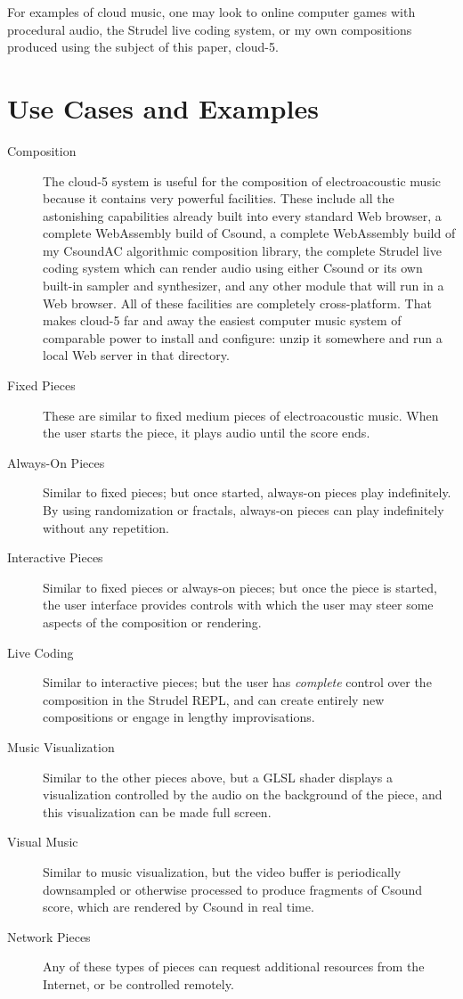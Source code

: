 \documentclass[runningheads,a4paper]{llncs}
\begin{document}
For examples of cloud music, one may look to online computer games with procedural audio, the Strudel live coding system, or my own compositions produced using the subject of this paper, cloud-5.

\section{Use Cases and Examples}

\begin{description}
\item[Composition] The cloud-5 system is useful for the composition of electroacoustic music because it contains very powerful facilities. These include all the astonishing capabilities already built into every standard Web browser, a complete WebAssembly build of Csound, a complete WebAssembly build of my CsoundAC algorithmic composition library, the complete Strudel live coding system which can render audio using either Csound or its own built-in sampler and synthesizer, and any other module that will run in a Web browser. All of these facilities are completely cross-platform. That makes cloud-5 far and away the easiest computer music system of comparable power to install and configure: unzip it somewhere and run a local Web server in that directory. 
\item[Fixed Pieces] These are similar to fixed medium pieces of electroacoustic music. When the user starts the piece, it plays audio until the score ends. \item[Always-On Pieces] Similar to fixed pieces; but once started, always-on pieces play indefinitely. By using randomization or fractals, always-on pieces can play indefinitely without any repetition.
\item[Interactive Pieces] Similar to fixed pieces or always-on pieces; but once the piece is started, the user interface provides controls with which the user may steer some aspects of the composition or rendering.
\item[Live Coding] Similar to interactive pieces; but the user has \emph{complete} control over the composition in the Strudel REPL, and can create entirely new compositions or engage in lengthy improvisations.
\item[Music Visualization] Similar to the other pieces above, but a GLSL shader displays a visualization controlled by the audio on the background of the piece, and this visualization can be made full screen.
\item[Visual Music] Similar to music visualization, but the video buffer is periodically downsampled or otherwise processed to produce fragments of Csound score, which are rendered by Csound in real time.
\item[Network Pieces] Any of these types of pieces can request additional resources from the Internet, or be controlled remotely.
\end{description}
\end{document}
